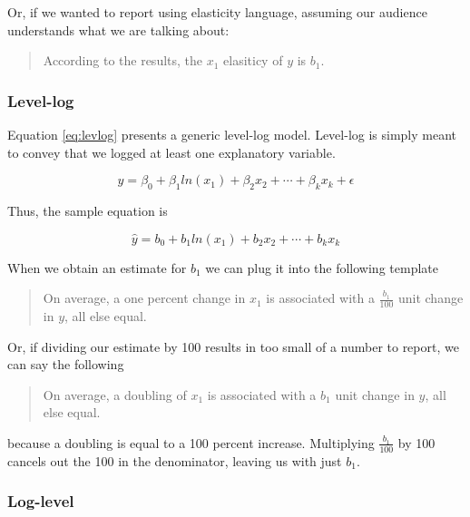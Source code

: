 \documentclass[
]{book}
\begin{document}
Or, if we wanted to report using elasticity language, assuming our audience understands what we are talking about:

\begin{quote}
According to the results, the \(x_1\) elasiticy of \(y\) is \(b_1\).
\end{quote}

\hypertarget{level-log}{%
\subsubsection*{Level-log}\label{level-log}}


Equation \eqref{eq:levlog} presents a generic level-log model. Level-log is simply meant to convey that we logged at least one explanatory variable.

\begin{equation}
y=\beta_0 + \beta_1ln(x_1) + \beta_2x_2 + \cdots + \beta_kx_k + \epsilon
\label{eq:levlog}
\end{equation}

Thus, the sample equation is

\begin{equation}
\hat{y}=b_0 + b_1ln(x_1) + b_2x_2 + \cdots + b_kx_k
\label{eq:levlogsamp}
\end{equation}

When we obtain an estimate for \(b_1\) we can plug it into the following template

\begin{quote}
On average, a one percent change in \(x_1\) is associated with a \(\frac{b_1}{100}\) unit change in \(y\), all else equal.
\end{quote}

Or, if dividing our estimate by 100 results in too small of a number to report, we can say the following

\begin{quote}
On average, a doubling of \(x_1\) is associated with a \(b_1\) unit change in \(y\), all else equal.
\end{quote}

because a doubling is equal to a 100 percent increase. Multiplying \(\frac{b_1}{100}\) by 100 cancels out the 100 in the denominator, leaving us with just \(b_1\).

\hypertarget{log-level}{%
\subsubsection*{Log-level}\label{log-level}}
\end{document}
